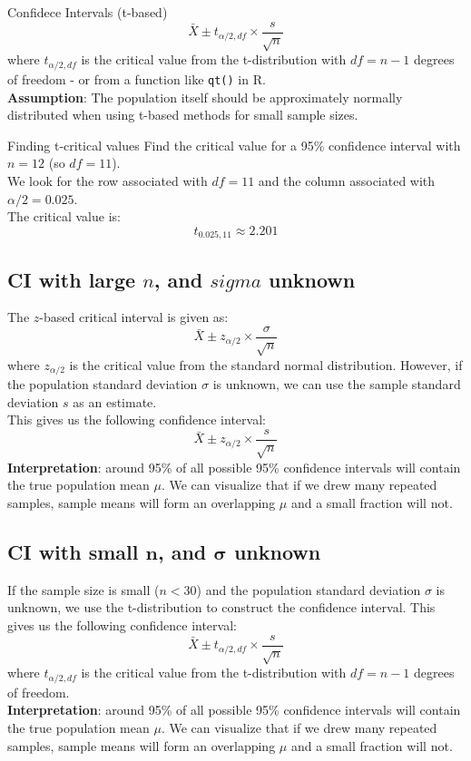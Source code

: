 \documentclass[10pt, total={6in, 8in}]{extarticle}
\begin{document}
\begin{definitionbox}{Confidece Intervals (t-based)}{}
    $$\bar{X} \pm t_{\alpha/2, df} \times \frac{s}{\sqrt{n}}$$
    where $t_{\alpha/2, df}$ is the critical value from the t-distribution with $df = n - 1$ degrees of freedom - or from a function like \texttt{qt()} in R.\\

    \textbf{Assumption}: The population itself should be approximately normally distributed when using t-based methods for small sample sizes.
\end{definitionbox}

\begin{examplebox}{Finding t-critical values}{}
    Find the critical value for a 95\% confidence interval with $n = 12$ (so $df = 11$).\\
    We look for the row associated with $df = 11$ and the column associated with $\alpha/2 = 0.025$.\\
    The critical value is:
    $$t_{0.025, 11} \approx 2.201$$
\end{examplebox}

\subsection{CI with large $n$, and $sigma$ unknown}
The $z$-based critical interval is given as:
$$\bar{X} \pm z_{\alpha/2} \times \frac{\sigma}{\sqrt{n}}$$
where $z_{\alpha/2}$ is the critical value from the standard normal distribution.
However, if the population standard deviation $\sigma$ is unknown, we can use the sample standard deviation $s$ as an estimate.\\
This gives us the following confidence interval:
$$\bar{X} \pm z_{\alpha/2} \times \frac{s}{\sqrt{n}}$$
\textbf{Interpretation}: around 95\% of all possible 95\% confidence intervals will contain the true population mean $\mu$. We can visualize that if we drew many repeated samples, sample means will form an overlapping $\mu$ and a small fraction will not.

\subsection{CI with small $\boldsymbol{n}$, and $\boldsymbol{\sigma}$ unknown}
If the sample size is small ($n < 30$) and the population standard deviation $\sigma$ is unknown, we use the t-distribution to construct the confidence interval. This gives us the following confidence interval:
$$\bar{X} \pm t_{\alpha/2, df} \times \frac{s}{\sqrt{n}}$$
where $t_{\alpha/2, df}$ is the critical value from the t-distribution with $df = n - 1$ degrees of freedom.\\
\textbf{Interpretation}: around 95\% of all possible 95\% confidence intervals will contain the true population mean $\mu$. We can visualize that if we drew many repeated samples, sample means will form an overlapping $\mu$ and a small fraction will not.
\end{document}
